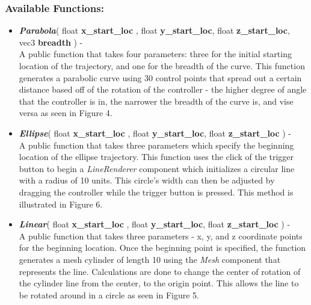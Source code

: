 \documentclass[draftclsnofoot,onecolumn,compsoc]{IEEEtran}
\begin{document}
\subsubsection{Available Functions:}
\begin{itemize}
\item \textbf{\textit{Parabola}}( float \textbf{x\_start\_loc} , float \textbf{y\_start\_loc}, float \textbf{z\_start\_loc},  vec3 \textbf{breadth} ) -\\
A public function that takes four parameters: three for the initial starting location of the trajectory, and one for the breadth of the curve. This function generates a parabolic curve using 30 control points that spread out a certain distance based off of the rotation of the controller - the higher degree of angle that the controller is in, the narrower the breadth of the curve is, and vise versa as seen in Figure 4. \\


\item \textbf{\textit{Ellipse}}( float \textbf{x\_start\_loc} , float \textbf{y\_start\_loc}, float \textbf{z\_start\_loc} ) -\\
A public function that takes three parameters which specify the beginning location of the ellipse trajectory. This function uses the click of the trigger button to begin a \textit{LineRenderer} component which initializes a circular line with a radius of 10 units. This circle's width can then be adjusted by dragging the controller while the trigger button is pressed. This method is illustrated in Figure 6. \\



\item \textbf{\textit{Linear}}( float \textbf{x\_start\_loc} , float \textbf{y\_start\_loc}, float \textbf{z\_start\_loc} ) -\\
A public function that takes three parameters - x, y, and z coordinate points for the beginning location. Once the beginning point is specified, the function generates a mesh cylinder of length 10 using the \textit{Mesh} component that represents the line. Calculations are done to change the center of rotation of the cylinder line from the center, to the origin point. This allows the line to be rotated around in a circle as seen in Figure 5.\\



\end{itemize}
\end{document}
